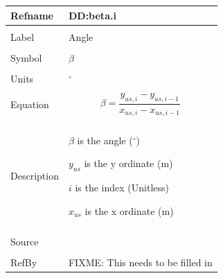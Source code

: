 \documentclass[12pt]{article}
\begin{document}
\noindent \begin{minipage}{\textwidth}
\begin{tabular}{p{} p{}}
\toprule \textbf{Refname} & \textbf{DD:beta.i}
\label{DD:beta.i}
\\ \midrule \\
Label & Angle
\\ \midrule \\
Symbol & $β$
\\ \midrule \\
Units & ${}^{\circ}$
\\ \midrule \\
Equation & \begin{dmath}
           β=\frac{{y_{us,i}}-{y_{us,i-1}}}{{x_{us,i}}-{x_{us,i-1}}}
           \end{dmath}
\\ \midrule \\
Description & \begin{symbDescription}
              \item{$β$ is the angle (${}^{\circ}$)}
              \item{${y_{us}}$ is the y ordinate (m)}
              \item{$i$ is the index (Unitless)}
              \item{${x_{us}}$ is the x ordinate (m)}
              \end{symbDescription}
\\ \midrule \\
Source & 
\\ \midrule \\
RefBy & FIXME: This needs to be filled in
\\ \bottomrule \end{tabular}
\end{minipage}\\
~\newline
\end{document}
